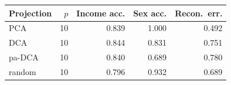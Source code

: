 \begin{tabular}{lrrrr}
\toprule
Projection & $p$ & Income acc. & Sex acc. & Recon.\ err. \\
\midrule
PCA & 10 & 0.839 & 1.000 & 0.492 \\
DCA & 10 & 0.844 & 0.831 & 0.751 \\
pa-DCA & 10 & 0.840 & 0.689 & 0.780 \\
random & 10 & 0.796 & 0.932 & 0.689 \\
\bottomrule
\end{tabular}
